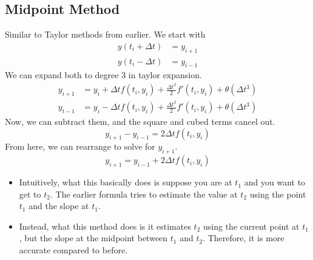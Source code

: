 \documentclass[10pt]{article}
\begin{document}
\subsection*{Midpoint Method}
Similar to Taylor methods from earlier.  We start with 
\begin{align*}
    y(t_i + \Delta t) &= y_{i + 1}\\
    y(t_i - \Delta t) &= y_{i - 1}
\end{align*}
We can expand both to degree 3 in taylor expansion.
\begin{align*}
    y_{i + 1} &= y_i + \Delta t f(t_i, y_i) + \frac{\Delta t^2}{2} f'(t_i, y_i) + \theta(\Delta t^3)\\
    y_{t - 1} &= y_i - \Delta t f(t_i, y_i) + \frac{\Delta t^2}{2} f'(t_i, y_i) + \theta(\Delta t^3)
\end{align*}
Now, we can subtract them, and the square and cubed terms cancel out.
\[y_{i + 1} - y_{i - 1} = 2\Delta t f(t_i, y_i)\]
From here, we can rearrange to solve for $y_{i + 1}$.
\[y_{i + 1} = y_{i - 1} + 2 \Delta t f(t_i, y_i)\]
\begin{itemize}
	\item Intuitively, what this basically does is suppose you are at $t_1$ and you want to get to $t_2$.  The earlier formula tries to estimate the value at $t_2$ using the point $t_1$ and the slope at $t_1$.  
	\item Instead, what this method does is it estimates $t_2$ using the current point at $t_1$, but the slope at the midpoint between $t_1$ and $t_2$.  Therefore, it is more accurate compared to before.
\end{itemize}
\end{document}
